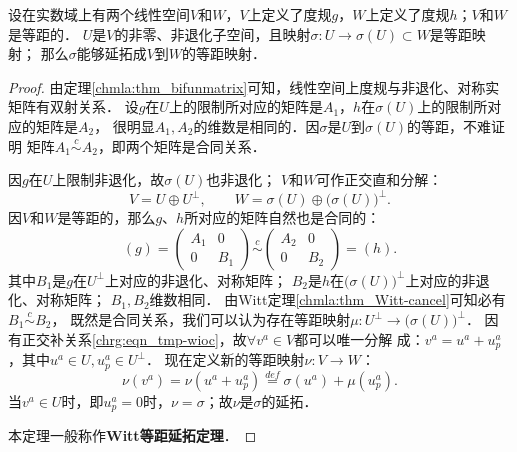 \begin{theorem}\label{chmla:thm_Witt-isometry}
    设在实数域上有两个线性空间$V$和$W$，$V$上定义了度规$g$，$W$上定义了度规$h$；$V$和$W$是等距的．
    $U$是$V$的非零、非退化子空间，且映射$\sigma:U\to \sigma(U)\subset W$是等距映射；
    那么$\sigma$能够延拓成$V$到$W$的等距映射．    
\end{theorem}

\begin{proof}
    由定理\ref{chmla:thm_bifunmatrix}可知，线性空间上度规与非退化、对称实矩阵有双射关系．
    设$g$在$U$上的限制所对应的矩阵是$A_1$，$h$在$\sigma(U)$上的限制所对应的矩阵是$A_2$，
    很明显$A_1,A_2$的维数是相同的．因$\sigma$是$U$到$\sigma(U)$的等距，不难证明
    矩阵$A_1\overset{c}{\sim} A_2$，即两个矩阵是合同关系．
    
    因$g$在$U$上限制非退化，故$\sigma(U)$也非退化；
    $V$和$W$可作正交直和分解：
    \begin{equation}\label{chrg:eqn_tmp-wioc}
        V = U \oplus U^\perp, \qquad
        W = \sigma(U) \oplus \bigl(\sigma(U)\bigr)^\perp .
    \end{equation}   
    因$V$和$W$是等距的，那么$g$、$h$所对应的矩阵自然也是合同的：
    \begin{equation}
        (g)=\begin{pmatrix}  A_1 &0 \\ 0 & B_1  \end{pmatrix} \overset{c}{\sim}
        \begin{pmatrix}  A_2 &0 \\ 0 & B_2  \end{pmatrix} =(h) .
    \end{equation}
    其中$B_1$是$g$在$U^\perp$上对应的非退化、对称矩阵；
    $B_2$是$h$在$\bigl(\sigma(U)\bigr)^\perp$上对应的非退化、对称矩阵；
    $B_1,B_2$维数相同．
    由Witt定理\ref{chmla:thm_Witt-cancel}可知必有$B_1 \overset{c}{\sim} B_2$，
    既然是合同关系，我们可以认为存在等距映射$\mu:U^\perp \to \bigl(\sigma(U)\bigr)^\perp$．
    因有正交补关系\eqref{chrg:eqn_tmp-wioc}，故$\forall v^a\in V$都可以唯一分解
    成：$v^a = u^a + u_p^a$，其中$u^a\in U, u_p^a \in U^\perp$．
    现在定义新的等距映射$\nu:V\to W$：
    \begin{equation}
        \nu (v^a)= \nu(u^a + u_p^a) \overset{def}{=}  \sigma(u^a) + \mu(u_p^a) .
    \end{equation}
    当$v^a\in U$时，即$u_p^a=0$时，$\nu=\sigma$；故$\nu$是$\sigma$的延拓．
    
    本定理一般称作{\bfseries \heiti Witt等距延拓定理}．
\end{proof}

